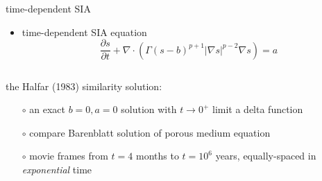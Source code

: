 \documentclass[hide notes,intlimits]{beamer}
\newcommand{\Div}{\nabla\cdot}
\begin{document}
\begin{frame}{time-dependent SIA}

\begin{itemize}
\item time-dependent SIA equation
  $$\frac{\partial s}{\partial t} + \Div \left(\Gamma (s-b)^{p+1} | \nabla s |^{p-2} \nabla s\right) = a$$
\end{itemize}

\begin{columns}
\begin{column}{0.4\textwidth}
\scriptsize
the Halfar (1983) similarity solution:
  \begin{itemize}
  \scriptsize
  \item[$\circ$] an exact $b=0,a=0$ solution with $t\to 0^+$ limit a delta function
  \item[$\circ$] compare Barenblatt solution of porous medium equation
  \item[$\circ$] movie frames from $t=4$ months to $t = 10^6$ years, equally-spaced in \emph{exponential} time
  \end{itemize}
\end{column}

\begin{column}{0.65\textwidth}
\vspace{-0.25in}
\begin{center}
\end{center}
\end{column}
\end{columns}
\end{frame}
\end{document}
